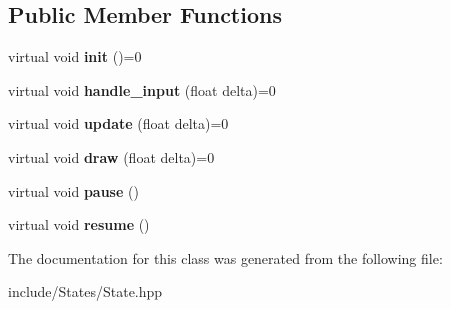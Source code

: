 \subsection*{Public Member Functions}
\begin{DoxyCompactItemize}
\item 
\mbox{\label{classcp_1_1_state_a680b39b3b4ad5c48976f92ec0fc24583}} 
virtual void {\bfseries init} ()=0
\item 
\mbox{\label{classcp_1_1_state_a368c6323f68a53faaf3cbcbe184daf9a}} 
virtual void {\bfseries handle\+\_\+input} (float delta)=0
\item 
\mbox{\label{classcp_1_1_state_a035c6962af689234630033bd3741ea1e}} 
virtual void {\bfseries update} (float delta)=0
\item 
\mbox{\label{classcp_1_1_state_a4cee56e000513cd065393cdc297a8256}} 
virtual void {\bfseries draw} (float delta)=0
\item 
\mbox{\label{classcp_1_1_state_a86eeda9796d7086669bc4275c3f9f98c}} 
virtual void {\bfseries pause} ()
\item 
\mbox{\label{classcp_1_1_state_afac74aaab36c734bdb9da377018a4ae4}} 
virtual void {\bfseries resume} ()
\end{DoxyCompactItemize}


The documentation for this class was generated from the following file\+:\begin{DoxyCompactItemize}
\item 
include/\+States/State.\+hpp\end{DoxyCompactItemize}

